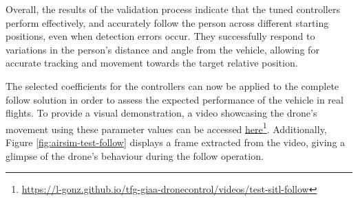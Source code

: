 Overall, the results of the validation process indicate that the tuned controllers perform effectively, and accurately follow the person across different starting positions, even when detection errors occur. They successfully respond to variations in the person's distance and angle from the vehicle, allowing for accurate tracking and movement towards the target relative position.

The selected coefficients for the controllers can now be applied to the complete follow solution in order to assess the expected performance of the vehicle in real flights. To provide a visual demonstration, a video showcasing the drone's movement using these parameter values can be accessed \href{https://l-gonz.github.io/tfg-giaa-dronecontrol/videos/test-sitl-follow}{here}\footnote{\url{https://l-gonz.github.io/tfg-giaa-dronecontrol/videos/test-sitl-follow}}. Additionally, Figure \ref{fig:airsim-test-follow} displays a frame extracted from the video, giving a glimpse of the drone's behaviour during the follow operation.



